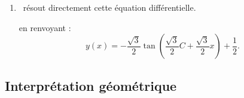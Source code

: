 \documentclass[class=report,crop=false]{standalone}
\begin{document}
\begin{enumerate}
  \item   %
    \Sage\ résout directement cette équation différentielle. 

  en renvoyant : 
$$  y\left(x\right) = -\frac{\sqrt{3}}{2} \tan\left(\frac{\sqrt{3}}{2} C + \frac{\sqrt{3}}{2}  x\right) + \frac{1}{2}.$$
  
  

\end{enumerate}


\subsection{Interprétation géométrique}
\end{document}
